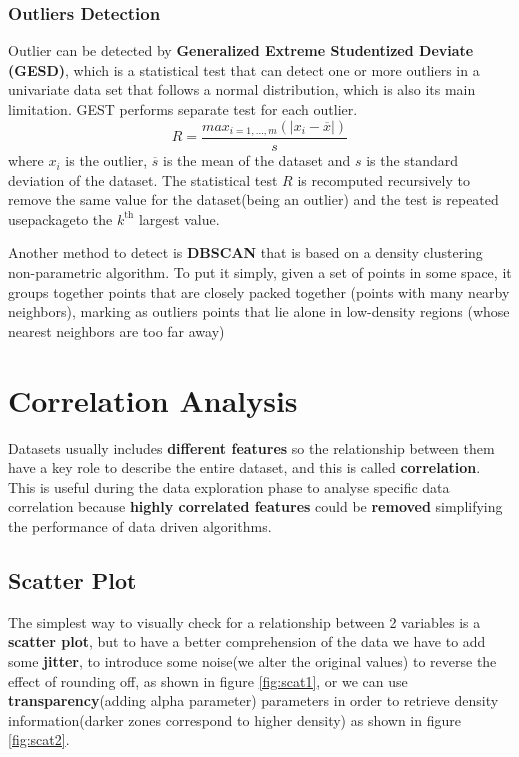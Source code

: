 \subsubsection{Outliers Detection}
Outlier can be detected by \textbf{Generalized Extreme Studentized
Deviate (GESD)}, which is a statistical test that can detect one or 
more outliers in a univariate data set that follows a normal 
distribution, which is also its main limitation.
GEST performs separate test for each outlier.
\begin{equation*}
  R = \dfrac{max_{i=1,\dots,m}(|x_i - \overline{x}|)}{s}
\end{equation*}
where $x_i$ is the outlier, $\overline{s}$ is the mean of the dataset 
and $s$ is the standard deviation of the dataset.
The statistical test $R$ is recomputed recursively to remove the same 
value for the dataset(being an outlier) and the test is repeated
usepackageto the $k^{\text{th}}$ largest value.


Another method to detect is \textbf{DBSCAN} that is based on a density
clustering non-parametric algorithm. To put it simply, given a set of
points in some space, it groups together points that are closely
packed together (points with many nearby neighbors), marking as
outliers points that lie alone in low-density regions (whose nearest
neighbors are too far away)

\section{Correlation Analysis}
Datasets usually includes \textbf{different features} so the
relationship between them have a key role to describe the entire
dataset, and this is called \textbf{correlation}. This is useful
during the data exploration phase to analyse specific data
correlation because \textbf{highly correlated features} could be
\textbf{removed} simplifying the performance of data driven
algorithms.

\subsection{Scatter Plot}
The simplest way to visually check for a relationship between 2
variables is a \textbf{scatter plot}, but to have a better
comprehension of the data we have to add some \textbf{jitter}, to
introduce some noise(we alter the original values) to reverse the
effect of rounding off, as shown in figure \ref{fig:scat1}, or we can
use \textbf{transparency}(adding alpha parameter) parameters in order
to retrieve density information(darker zones correspond to higher
density) as shown in figure \ref{fig:scat2}.

